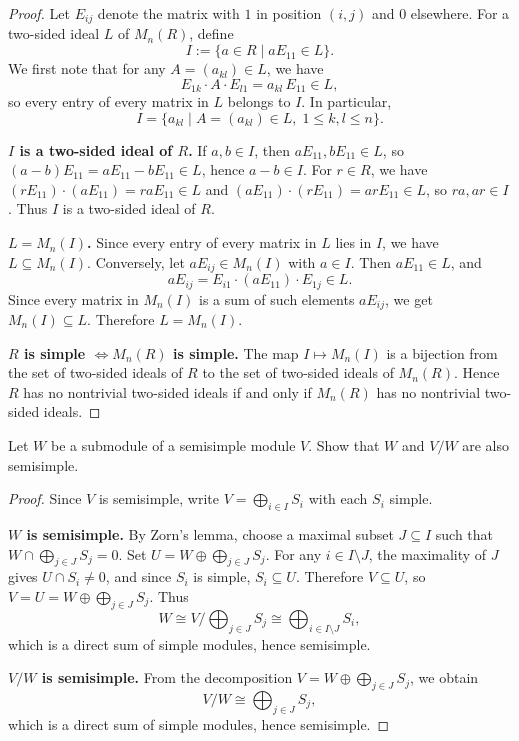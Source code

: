 \begin{proof}
    Let $E_{ij}$ denote the matrix with $1$ in position $(i,j)$ and $0$ elsewhere. For a two-sided ideal $L$ of $M_n(R)$, define
    \[
        I:=\{a\in R\mid aE_{11}\in L\}.
    \]
    We first note that for any $A=(a_{kl})\in L$, we have
    \[
        E_{1k}\cdot A\cdot E_{l1}=a_{kl}\,E_{11}\in L,
    \]
    so every entry of every matrix in $L$ belongs to $I$. In particular,
    \[
        I=\{a_{kl}\mid A=(a_{kl})\in L,\; 1\leq k,l\leq n\}.
    \]

    \textbf{$I$ is a two-sided ideal of $R$.}
    If $a,b\in I$, then $aE_{11},bE_{11}\in L$, so $(a-b)E_{11}=aE_{11}-bE_{11}\in L$, hence $a-b\in I$. For $r\in R$, we have $(rE_{11})\cdot(aE_{11})=raE_{11}\in L$ and $(aE_{11})\cdot(rE_{11})=arE_{11}\in L$, so $ra,ar\in I$. Thus $I$ is a two-sided ideal of $R$.

    \textbf{$L=M_n(I)$.}
    Since every entry of every matrix in $L$ lies in $I$, we have $L\subseteq M_n(I)$. Conversely, let $aE_{ij}\in M_n(I)$ with $a\in I$. Then $aE_{11}\in L$, and
    \[
        aE_{ij}=E_{i1}\cdot(aE_{11})\cdot E_{1j}\in L.
    \]
    Since every matrix in $M_n(I)$ is a sum of such elements $aE_{ij}$, we get $M_n(I)\subseteq L$. Therefore $L=M_n(I)$.

    \textbf{$R$ is simple $\Longleftrightarrow M_n(R)$ is simple.}
    The map $I\mapsto M_n(I)$ is a bijection from the set of two-sided ideals of $R$ to the set of two-sided ideals of $M_n(R)$. Hence $R$ has no nontrivial two-sided ideals if and only if $M_n(R)$ has no nontrivial two-sided ideals.
\end{proof}

\begin{exercise}
    Let \(W\) be a submodule of a semisimple module \(V\). Show that \(W\) and \(V/W\) are also semisimple.
\end{exercise}

\begin{proof}
    Since $V$ is semisimple, write $V=\bigoplus_{i\in I}S_i$ with each $S_i$ simple.

    \textbf{$W$ is semisimple.}
    By Zorn's lemma, choose a maximal subset $J\subseteq I$ such that $W\cap\bigoplus_{j\in J}S_j=0$. Set $U=W\oplus\bigoplus_{j\in J}S_j$. For any $i\in I\setminus J$, the maximality of $J$ gives $U\cap S_i\neq 0$, and since $S_i$ is simple, $S_i\subseteq U$. Therefore $V\subseteq U$, so $V=U=W\oplus\bigoplus_{j\in J}S_j$. Thus
    \[
        W\cong V\Big/\bigoplus_{j\in J}S_j\cong \bigoplus_{i\in I\setminus J}S_i,
    \]
    which is a direct sum of simple modules, hence semisimple.

    \textbf{$V/W$ is semisimple.}
    From the decomposition $V=W\oplus\bigoplus_{j\in J}S_j$, we obtain
    \[
        V/W\cong \bigoplus_{j\in J}S_j,
    \]
    which is a direct sum of simple modules, hence semisimple.
\end{proof}

